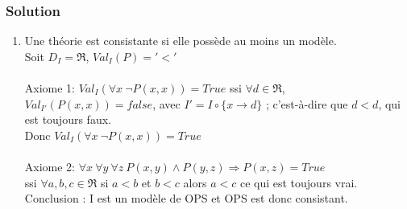     \subsubsection*{Solution}
    \begin{enumerate}

	\item Une théorie est consistante si elle possède au moins un modèle.\\
    Soit $D_I = \Re$, $Val_I(P) = '<'$\\
    \\
    Axiome 1: $Val_I (\forall x \ \neg P(x,x)) = True$ ssi $\forall d \in \Re$, $Val_{I'} ( P(x,x)) = false$, avec $I' = I \circ \{x \rightarrow d\}$ ; c'est-à-dire que $d<d$, qui est toujours faux.\\
    Donc $Val_I (\forall x \ \neg P(x,x)) = True$\\
    \\
    Axiome 2: $\forall x \ \forall y \ \forall z \ P(x, y) \wedge P(y, z) \Rightarrow P(x, z)= True$ \\
    ssi $\forall a,b,c \in \Re $  si $a <b$ et $b<c$ alors $a<c$ ce qui est toujours vrai.\\
    Conclusion : I est un modèle de OPS et OPS est donc consistant.


\end{enumerate}
